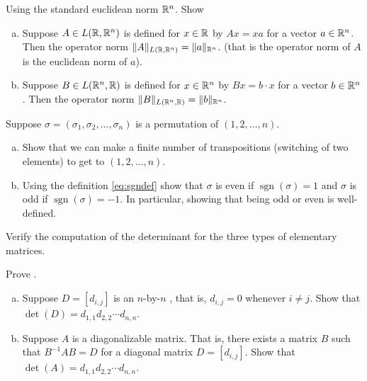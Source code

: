 \begin{exercise} \label{exercise:normonedim}
Using the standard euclidean norm ${\mathbb{R}}^n$. Show
\begin{enumerate}[a)]
\item
Suppose $A \in L({\mathbb{R}},{\mathbb{R}}^n)$ is defined for $x \in {\mathbb{R}}$ by $Ax = xa$
for a vector $a \in {\mathbb{R}}^n$.
Then the operator norm $\lVert {A} \rVert_{L({\mathbb{R}},{\mathbb{R}}^n)} = \lVert {a} \rVert_{{\mathbb{R}}^n}$.
(that is the operator norm of $A$ is the euclidean norm of $a$).
\item
Suppose $B \in L({\mathbb{R}}^n,{\mathbb{R}})$ is defined for $x \in {\mathbb{R}}^n$ by $Bx = b \cdot x$
for a vector $b \in {\mathbb{R}}^n$.
Then the operator norm $\lVert {B} \rVert_{L({\mathbb{R}}^n,{\mathbb{R}})} = \lVert {b} \rVert_{{\mathbb{R}}^n}$.
\end{enumerate}
\end{exercise}

\begin{exercise}
Suppose $\sigma = (\sigma_1,\sigma_2,\ldots,\sigma_n)$ is a permutation of
$(1,2,\ldots,n)$.
\begin{enumerate}[a)]
\item
Show that we can make a finite number of transpositions (switching of two
elements) to get to $(1,2,\ldots,n)$.
\item
Using the definition \eqref{eq:sgndef}
show that $\sigma$ is even if $\operatorname{sgn}(\sigma) = 1$ and $\sigma$
is odd if $\operatorname{sgn}(\sigma) = -1$.  In particular, showing that
being odd or even is well-defined.
\end{enumerate}
\end{exercise}

\begin{exercise}
Verify the computation of the determinant for the three types of 
elementary matrices.
\end{exercise}

\begin{exercise}
Prove .
\end{exercise}

\begin{exercise}
\leavevmode
\begin{enumerate}[a)]
\item
Suppose $D = [d_{i,j}]$ is an $n$-by-$n$ \emph{}, that is, $d_{i,j} = 0$ whenever $i
\not= j$.  Show that $\det(D) = d_{1,1}d_{2,2} \cdots d_{n,n}$.
\item
Suppose $A$ is a diagonalizable matrix.  That is, there exists a matrix
$B$ such that $B^{-1}AB = D$ for a diagonal matrix $D = [d_{i,j}]$.  Show
that $\det(A) = d_{1,1}d_{2,2} \cdots d_{n,n}$.
\end{enumerate}
\end{exercise}

